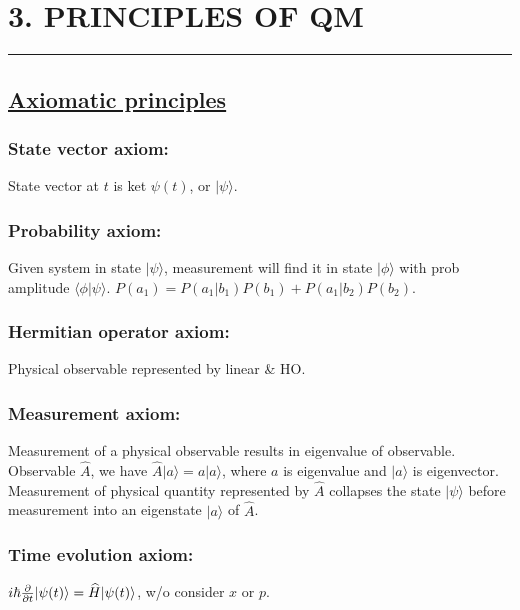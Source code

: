 \section{3. PRINCIPLES OF QM} \hrule height 0.3pt 

\subsection{\underline{Axiomatic principles}}

\subsubsection{State vector axiom:} State vector at $t$ is ket $\psi(t)$, or $|\psi \rangle$.

\subsubsection{Probability axiom:} Given system in state $|\psi \rangle$, measurement will find it in state $|\phi \rangle$ with prob amplitude $\langle \phi | \psi \rangle$. $P(a_1) = P(a_1 | b_1)P(b_1) + P(a_1 | b_2) P(b_2)$.

\subsubsection{Hermitian operator axiom:} Physical observable represented by linear \& HO.

\subsubsection{Measurement axiom:} Measurement of a physical observable results in eigenvalue of observable. Observable $\widehat{A}$, we have $\widehat{A} | a \rangle = a | a \rangle$, where $a$ is eigenvalue and $|a \rangle$ is eigenvector. Measurement of physical quantity represented by $\widehat{A}$ collapses the state $|\psi \rangle$ before measurement into an eigenstate $|a \rangle$ of $\widehat{A}$.

\subsubsection{Time evolution axiom:} $i \hbar \pdv{}{t} | \psi(t) \rangle = \widehat{H} |\psi(t) \rangle$, w/o consider $x$ or $p$.

